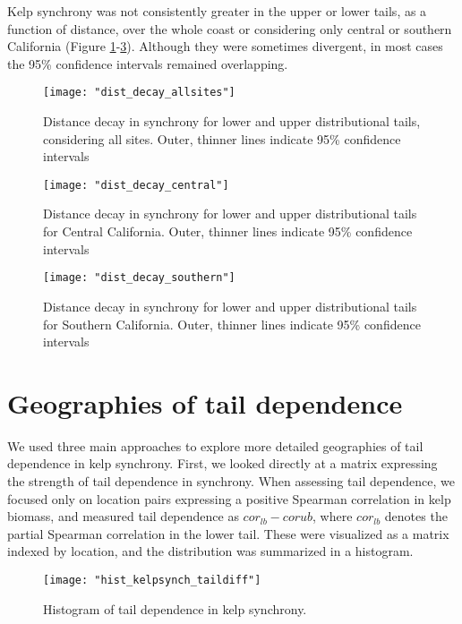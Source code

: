 \documentclass[12pt, oneside]{article}
\begin{document}
Kelp synchrony was not consistently greater in the upper or lower tails, as a function of distance, over the whole coast or considering only central or southern California (Figure \ref{fig:distdecall}-\ref{fig:distdecsouth}).
Although they were sometimes divergent, in most cases the 95\% confidence intervals remained overlapping.

\begin{figure}
    \centering
    \texttt{[image: "dist\_decay\_allsites"]}
    \caption{Distance decay in synchrony for lower and upper distributional tails, considering all sites. Outer, thinner lines indicate 95\% confidence intervals}
    \label{fig:distdecall}
\end{figure}

\begin{figure}
    \centering
    \texttt{[image: "dist\_decay\_central"]}
    \caption{Distance decay in synchrony for lower and upper distributional tails for Central California. Outer, thinner lines indicate 95\% confidence intervals}
    \label{fig:distdeccentl}
\end{figure}

\begin{figure}
    \centering
    \texttt{[image: "dist\_decay\_southern"]}
    \caption{Distance decay in synchrony for lower and upper distributional tails for Southern California. Outer, thinner lines indicate 95\% confidence intervals}
    \label{fig:distdecsouth}
\end{figure}


\section{Geographies of tail dependence}

We used three main approaches to explore more detailed geographies of tail dependence in kelp synchrony.
First, we looked directly at a matrix expressing the strength of tail dependence in synchrony.
When assessing tail dependence, we focused only on location pairs expressing a positive Spearman correlation in kelp biomass, and measured tail dependence as $cor_{lb} - cor{ub}$, where $cor_{lb}$ denotes the partial Spearman correlation in the lower tail.
These were visualized as a matrix indexed by location, and the distribution was summarized in a histogram.

\begin{figure}
   \centering
   \texttt{[image: "hist\_kelpsynch\_taildiff"]}
   \caption{Histogram of tail dependence in kelp synchrony.}
   \label{fig:synchhist}
\end{figure}
\end{document}
